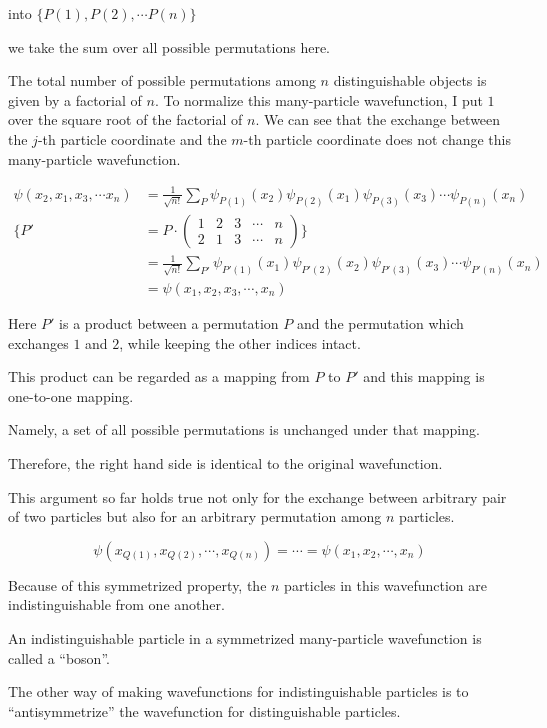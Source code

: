 into $\{P(1),P(2),\cdots P(n)\}$

we take the sum over all possible permutations here. 

The total number of possible permutations among $n$ distinguishable objects is given by a factorial of $n$. To normalize this many-particle wavefunction, I put $1$ over the square root of the factorial of $n$. We can see that the exchange between the $j$-th particle coordinate and the $m$-th particle coordinate does not change this many-particle wavefunction. 

\[\begin{split}
\psi(x_2,x_1,x_3,\cdots x_n) &= \frac{1}{\sqrt{n!}}\sum_P\psi_{P(1)}(x_2)\psi_{P(2)}(x_1)\psi_{P(3)}(x_3)\cdots\psi_{P(n)}(x_n)\\
\Big\{P' &= P\cdot\left(
\begin{matrix}
1 & 2 & 3 & \cdots & n\\
2 & 1 & 3 & \cdots & n
\end{matrix}\right)\Big\}\\
&=\frac{1}{\sqrt{n!}}\sum_{P'}\psi_{P'(1)}(x_1)\psi_{P'(2)}(x_2)\psi_{P'(3)}(x_3)\cdots\psi_{P'(n)}(x_n)\\
&= \psi(x_1,x_2,x_3,\cdots, x_n)
\end{split}\]

Here $P'$ is a product between a permutation $P$ and the permutation which exchanges $1$ and $2$, while keeping the other indices intact. 

This product can be regarded as a mapping from $P$ to $P'$ and this mapping is one-to-one mapping. 

Namely, a set of all possible permutations is unchanged under that mapping. 

Therefore, the right hand side is identical to the original wavefunction. 

This argument so far holds true not only for the exchange between arbitrary pair of two particles but also for an arbitrary permutation among $n$ particles. 

\[\psi(x_{Q(1)},x_{Q(2)},\cdots,x_{Q(n)}) = \cdots=\psi(x_1,x_2,\cdots,x_n) \]

Because of this symmetrized property, the $n$ particles in this wavefunction are indistinguishable from one another. 

An indistinguishable particle in a symmetrized many-particle wavefunction is called a ``boson''. 

The other way of making wavefunctions for indistinguishable particles is to ``antisymmetrize'' the wavefunction for distinguishable particles. %

